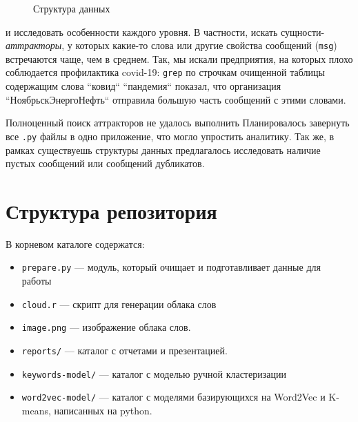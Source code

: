 \documentclass{article}
\begin{document}
\begin{figure}[h!]
    \centering
    \caption{Структура данных}
    \label{fig:structure}
\end{figure}

и исследовать особенности каждого уровня. В частности, искать сущности-\textit{аттракторы}, у которых какие-то слова или другие свойства сообщений (\texttt{msg}) встречаются чаще, чем в среднем. Так, мы искали предприятия, на которых плохо соблюдается профилактика covid-19: \texttt{grep} по строчкам очищенной таблицы содержащим слова ``ковид`` ``пандемия`` показал, что организация ``НоябрьскЭнергоНефть`` отправила большую часть сообщений с этими словами.

Полноценный поиск аттракторов не удалось выполнить 
Планировалось завернуть все \texttt{.py} файлы в одно приложение, что могло упростить аналитику. Так же, в рамках существуешь структуры данных предлагалось исследовать наличие пустых сообщений или сообщений дубликатов.



\section{Структура репозитория}
В корневом каталоге содержатся:
\begin{itemize}
    \item \texttt{prepare.py} --- модуль, который очищает и подготавливает данные для работы
    \item \texttt{cloud.r} --- скрипт для генерации облака слов
    \item \texttt{image.png} --- изображение облака слов.
    \item \texttt{reports/} --- каталог с отчетами и презентацией.
    \item \texttt{keywords-model/} --- каталог с моделью ручной кластеризации
    \item \texttt{word2vec-model/} --- каталог с моделями базирующихся на Word2Vec и K-means, написанных на python.
\end{itemize}
\end{document}
